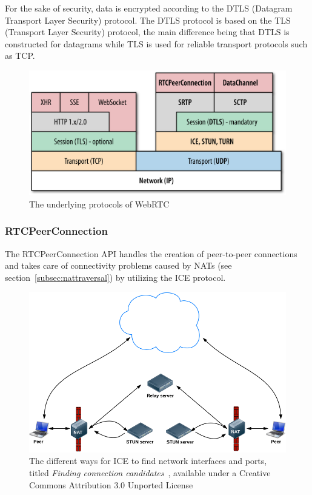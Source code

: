 For the sake of security, data is encrypted according to the DTLS (Datagram Transport Layer Security) protocol. The DTLS protocol is based on the TLS (Transport Layer Security) protocol, the main difference being that DTLS is constructed for datagrams while TLS is used for reliable transport protocols such as TCP.

\begin{figure}[htp]
\centering
\includegraphics[width=\textwidth,height=0.25\paperheight,keepaspectratio
]{figures/webrtc_protocol_stack}
\caption{The underlying protocols of WebRTC~\cite{WebRTCProtocolStack:Online}}
\label{fig:WebRTCProtocols}
\end{figure}


\subsubsection{RTCPeerConnection}
\label{subsubsec:rtcpeerconnection}
The RTCPeerConnection API handles the creation of peer-to-peer connections and takes care of connectivity problems caused by NATs (see section~\ref{subsec:nattraversal}) by utilizing the ICE protocol. 

\begin{figure}[htp]
\centering
\includegraphics[width=\textwidth,height=0.25\paperheight,keepaspectratio
]{figures/ICE}
\caption{{The different ways for ICE to find network interfaces and ports, titled \emph{Finding connection candidates}~\cite{WebRTCBasics:2012:Online}, available under a Creative Commons Attribution 3.0 Unported License\protect\footnotemark}}
\label{fig:ICE}
\end{figure}

